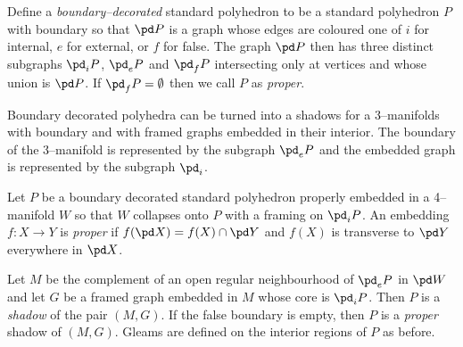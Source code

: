 \begin{defn}
  Define a \emph{boundary--decorated} standard polyhedron to be a standard polyhedron $P$ with boundary so that $\pd P$ is a graph whose edges are coloured one of $i$ for internal, $e$ for external, or $f$ for false.
  The graph $\pd P$ then has three distinct subgraphs $\pd_i P$, $\pd_e P$ and $\pd_f P$ intersecting only at vertices and whose union is $\pd P$.
  If $\pd_f P=\emptyset$ then we call $P$ as \emph{proper}.
\end{defn}

Boundary decorated polyhedra can be turned into a shadows for a 3--manifolds with boundary and with framed graphs embedded in their interior.
The boundary of the 3--manifold is represented by the subgraph $\pd_e P$ and the embedded graph is represented by the subgraph $\pd_i$.

\begin{defn}
  Let $P$ be a boundary decorated standard polyhedron properly embedded in a 4--manifold $W$ so that $W$ collapses onto $P$ with a framing on $\pd_i P$.
  An embedding $f:X\to Y$ is \emph{proper} if $f(\pd X) = f(X)\cap \pd Y$ and $f(X)$ is transverse to $\pd Y$ everywhere in $\pd X$.
  
  Let $M$ be the complement of an open regular neighbourhood of $\pd_e P$ in $\pd W$ and let $G$ be a framed graph embedded in $M$ whose core is $\pd_i P$.
  Then $P$ is a \emph{shadow} of the pair $(M,G)$.
  If the false boundary is empty, then $P$ is a \emph{proper} shadow of $(M,G)$.
  Gleams are defined on the interior regions of $P$ as before.
\end{defn}


